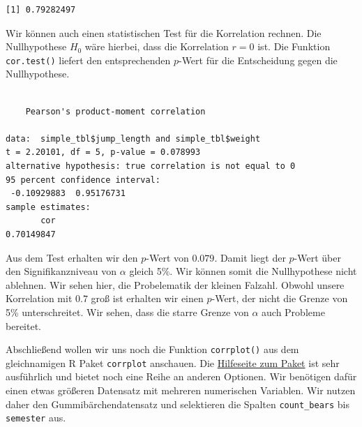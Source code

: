 \documentclass[
  letterpaper,
]{scrbook}
\newenvironment{Shaded}{\begin{snugshade}}{\end{snugshade}}
\newcommand{\AttributeTok}[1]{\textcolor[rgb]{0.40,0.45,0.13}{#1}}
\newcommand{\FunctionTok}[1]{\textcolor[rgb]{0.28,0.35,0.67}{#1}}
\newcommand{\NormalTok}[1]{\textcolor[rgb]{0.00,0.23,0.31}{#1}}
\newcommand{\SpecialCharTok}[1]{\textcolor[rgb]{0.37,0.37,0.37}{#1}}
\newcommand{\StringTok}[1]{\textcolor[rgb]{0.13,0.47,0.30}{#1}}
\begin{document}
\begin{Shaded}
\end{Shaded}

\begin{verbatim}
[1] 0.79282497
\end{verbatim}

Wir können auch einen statistischen Test für die Korrelation rechnen.
Die Nullhypothese \(H_0\) wäre hierbei, dass die Korrelation \(r = 0\)
ist. Die Funktion \texttt{cor.test()} liefert den entsprechenden
\(p\)-Wert für die Entscheidung gegen die Nullhypothese.

\begin{Shaded}
\end{Shaded}

\begin{verbatim}

    Pearson's product-moment correlation

data:  simple_tbl$jump_length and simple_tbl$weight
t = 2.20101, df = 5, p-value = 0.078993
alternative hypothesis: true correlation is not equal to 0
95 percent confidence interval:
 -0.10929883  0.95176731
sample estimates:
       cor 
0.70149847 
\end{verbatim}

Aus dem Test erhalten wir den \(p\)-Wert von \(0.079\). Damit liegt der
\(p\)-Wert über den Signifikanzniveau von \(\alpha\) gleich 5\%. Wir
können somit die Nullhypothese nicht ablehnen. Wir sehen hier, die
Probelematik der kleinen Falzahl. Obwohl unsere Korrelation mit \(0.7\)
groß ist erhalten wir einen \(p\)-Wert, der nicht die Grenze von 5\%
unterschreitet. Wir sehen, dass die starre Grenze von \(\alpha\) auch
Probleme bereitet.

Abschließend wollen wir uns noch die Funktion \texttt{corrplot()} aus
dem gleichnamigen R Paket \texttt{corrplot} anschauen. Die
\href{https://cran.r-project.org/web/packages/corrplot/vignettes/corrplot-intro.html}{Hilfeseite
zum Paket} ist sehr ausführlich und bietet noch eine Reihe an anderen
Optionen. Wir benötigen dafür einen etwas größeren Datensatz mit
mehreren numerischen Variablen. Wir nutzen daher den
Gummibärchendatensatz und selektieren die Spalten \texttt{count\_bears}
bis \texttt{semester} aus.
\end{document}
